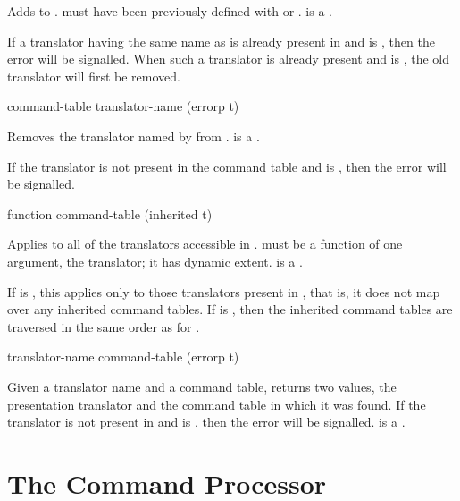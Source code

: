 Adds  to .   must
have been previously defined with 
or .
 is a .

If a translator having the same name as  is already
present in  and  is , then
the  error will be signalled.  When such a
translator is already present and  is , the
old translator will first be removed.


 {command-table translator-name
                                                            \key (errorp t)}

Removes the translator named by  from .
 is a .

If the translator is not present in the command table and  is
, then the  error will be signalled.


 {function command-table \key (inherited t)}

Applies  to all of the translators accessible in
.   must be a function of one argument, the
translator; it has dynamic extent.   is a .

If  is , this applies  only to
those translators present in , that is, it does
not map over any inherited command tables.  If  is
, then the inherited command tables are traversed in the same
order as for .


 {translator-name command-table \key (errorp t)}

Given a translator name and a command table, returns two values, the
presentation translator and the command table in which it was found.  If the
translator is not present in  and  is
, then the  error will be signalled.
 is a .


\section {The Command Processor}


